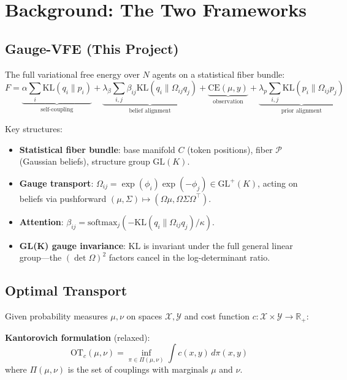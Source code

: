 \documentclass[11pt]{article}
\newcommand{\KL}{\mathrm{KL}}
\newcommand{\OT}{\mathrm{OT}}
\newcommand{\GL}{\mathrm{GL}}
\newcommand{\R}{\mathbb{R}}
\begin{document}
\section{Background: The Two Frameworks}

\subsection{Gauge-VFE (This Project)}

The full variational free energy over $N$ agents on a statistical fiber bundle:
\begin{equation}\label{eq:vfe}
F = \underbrace{\alpha \sum_i \KL(q_i \| p_i)}_{\text{self-coupling}}
  + \underbrace{\lambda_\beta \sum_{i,j} \beta_{ij} \KL(q_i \| \Omega_{ij} q_j)}_{\text{belief alignment}}
  + \underbrace{\text{CE}(\mu, y)}_{\text{observation}}
  + \underbrace{\lambda_p \sum_{i,j} \KL(p_i \| \Omega_{ij} p_j)}_{\text{prior alignment}}
\end{equation}

Key structures:
\begin{itemize}
    \item \textbf{Statistical fiber bundle}: base manifold $C$ (token positions), fiber $\mathcal{P}$ (Gaussian beliefs), structure group $\GL(K)$.
    \item \textbf{Gauge transport}: $\Omega_{ij} = \exp(\phi_i)\exp(-\phi_j) \in \GL^+(K)$, acting on beliefs via pushforward $(\mu, \Sigma) \mapsto (\Omega\mu, \Omega\Sigma\Omega^\top)$.
    \item \textbf{Attention}: $\beta_{ij} = \text{softmax}_j(-\KL(q_i \| \Omega_{ij}q_j)/\kappa)$.
    \item \textbf{GL(K) gauge invariance}: $\KL$ is invariant under the full general linear group---the $(\det\Omega)^2$ factors cancel in the log-determinant ratio.
\end{itemize}

\subsection{Optimal Transport}

Given probability measures $\mu, \nu$ on spaces $\mathcal{X}, \mathcal{Y}$ and cost function $c: \mathcal{X} \times \mathcal{Y} \to \R_+$:

\textbf{Kantorovich formulation} (relaxed):
\begin{equation}\label{eq:kantorovich}
\OT_c(\mu,\nu) = \inf_{\pi \in \Pi(\mu,\nu)} \int c(x,y)\,d\pi(x,y)
\end{equation}
where $\Pi(\mu,\nu)$ is the set of couplings with marginals $\mu$ and $\nu$.
\end{document}
